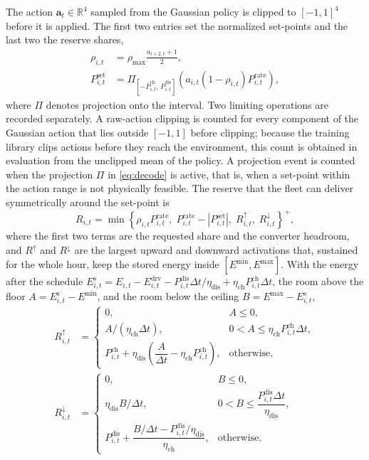 The action $\mathbf{a}_t\in\mathbb{R}^4$ sampled from the Gaussian
policy is clipped to $[-1,1]^4$ before it is applied. The first two
entries set the normalized set-points and the last two the reserve
shares,
\begin{align}
\rho_{i,t}&=\rho_{\max}\frac{a_{i+2,t}+1}{2},\nonumber\\
P^{\mathrm{set}}_{i,t}&=\Pi_{[-\bar P^{\mathrm{ch}}_{i,t},\,\bar P^{\mathrm{dis}}_{i,t}]}
\left(a_{i,t}(1-\rho_{i,t})P^{\mathrm{rate}}_{i,t}\right),
\label{eq:decode}
\end{align}
where $\Pi$ denotes projection onto the interval. Two limiting
operations are recorded separately. A raw-action clipping is counted
for every component of the Gaussian action that lies outside
$[-1,1]$ before clipping; because the training library clips actions
before they reach the environment, this count is obtained in
evaluation from the unclipped mean of the policy. A projection event
is counted when the projection $\Pi$ in \eqref{eq:decode} is active,
that is, when a set-point within the action range is not physically
feasible. The reserve that the fleet can deliver symmetrically around
the set-point is
\begin{equation}
R_{i,t}=\min\left\{\rho_{i,t}P^{\mathrm{rate}}_{i,t},\;
P^{\mathrm{rate}}_{i,t}-|P^{\mathrm{set}}_{i,t}|,\;
R^{\uparrow}_{i,t},\;R^{\downarrow}_{i,t}\right\}^{+},
\label{eq:reserve}
\end{equation}
where the first two terms are the requested share and the converter
headroom, and $R^{\uparrow}$ and $R^{\downarrow}$ are the largest
upward and downward activations that, sustained for the whole hour,
keep the stored energy inside $[E^{\min},E^{\max}]$. With the energy
after the schedule
$E^{\mathrm{s}}_{i,t}=E_{i,t}-E^{\mathrm{drv}}_{i,t}
-P^{\mathrm{dis}}_{i,t}\Delta t/\eta_{\mathrm{dis}}
+\eta_{\mathrm{ch}}P^{\mathrm{ch}}_{i,t}\Delta t$,
the room above the floor $A=E^{\mathrm{s}}_{i,t}-E^{\min}$, and the room
below the ceiling $B=E^{\max}-E^{\mathrm{s}}_{i,t}$,
\begin{align}
R^{\uparrow}_{i,t}&=
\begin{cases}
0, & A\le 0,\\
A/(\eta_{\mathrm{ch}}\Delta t), & 0<A\le\eta_{\mathrm{ch}}P^{\mathrm{ch}}_{i,t}\Delta t,\\
P^{\mathrm{ch}}_{i,t}+\eta_{\mathrm{dis}}\!\left(\dfrac{A}{\Delta t}-\eta_{\mathrm{ch}}P^{\mathrm{ch}}_{i,t}\right), & \text{otherwise},
\end{cases}\label{eq:rup}\\
R^{\downarrow}_{i,t}&=
\begin{cases}
0, & B\le 0,\\
\eta_{\mathrm{dis}}B/\Delta t, & 0<B\le \dfrac{P^{\mathrm{dis}}_{i,t}\Delta t}{\eta_{\mathrm{dis}}},\\[4pt]
P^{\mathrm{dis}}_{i,t}+\dfrac{B/\Delta t-P^{\mathrm{dis}}_{i,t}/\eta_{\mathrm{dis}}}{\eta_{\mathrm{ch}}}, & \text{otherwise}.
\end{cases}\label{eq:rdn}
\end{align}
